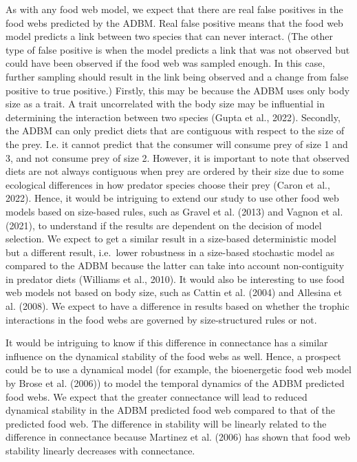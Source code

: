 \documentclass{article}
\begin{document}
As with any food web model, we expect that there are real false
positives in the food webs predicted by the ADBM. Real false positive
means that the food web model predicts a link between two species that
can never interact. (The other type of false positive is when the model
predicts a link that was not observed but could have been observed if
the food web was sampled enough. In this case, further sampling should
result in the link being observed and a change from false positive to
true positive.) Firstly, this may be because the ADBM uses only body
size as a trait. A trait uncorrelated with the body size may be
influential in determining the interaction between two species (Gupta et
al., 2022). Secondly, the ADBM can only predict diets that are
contiguous with respect to the size of the prey. I.e. it cannot predict
that the consumer will consume prey of size 1 and 3, and not consume
prey of size 2. However, it is important to note that observed diets are
not always contiguous when prey are ordered by their size due to some
ecological differences in how predator species choose their prey (Caron
et al., 2022). Hence, it would be intriguing to extend our study to use
other food web models based on size-based rules, such as Gravel et al.
(2013) and Vagnon et al. (2021), to understand if the results are
dependent on the decision of model selection. We expect to get a similar
result in a size-based deterministic model but a different result,
i.e.~lower robustness in a size-based stochastic model as compared to
the ADBM because the latter can take into account non-contiguity in
predator diets (Williams et al., 2010). It would also be interesting to
use food web models not based on body size, such as Cattin et al. (2004)
and Allesina et al. (2008). We expect to have a difference in results
based on whether the trophic interactions in the food webs are governed
by size-structured rules or not.

It would be intriguing to know if this difference in connectance has a
similar influence on the dynamical stability of the food webs as well.
Hence, a prospect could be to use a dynamical model (for example, the
bioenergetic food web model by Brose et al. (2006)) to model the
temporal dynamics of the ADBM predicted food webs. We expect that the
greater connectance will lead to reduced dynamical stability in the ADBM
predicted food web compared to that of the predicted food web. The
difference in stability will be linearly related to the difference in
connectance because Martinez et al. (2006) has shown that food web
stability linearly decreases with connectance.
\end{document}
